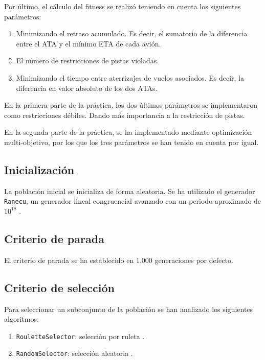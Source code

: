 \documentclass[a4paper,12pt,titlepage]{article}
\begin{document}
Por último, el cálculo del fitness se realizó teniendo en cuenta los siguientes parámetros:

\begin{enumerate}[noitemsep]
	\item Minimizando el retraso acumulado. Es decir, el sumatorio de la diferencia entre el ATA y el mínimo ETA de cada avión.
	\item El número de restricciones de pistas violadas.
	\item Minimizando el tiempo entre aterrizajes de vuelos asociados. Es decir, la diferencia en valor absoluto de los dos ATAs.
\end{enumerate}

En la primera parte de la práctica, los dos últimos parámetros se implementaron como restricciones débiles. Dando más importancia a la restricción de pistas.

En la segunda parte de la práctica, se ha implementado mediante optimización multi-objetivo, por los que los tres parámetros se han tenido en cuenta por igual.

\subsection{Inicialización}

La población inicial se inicializa de forma aleatoria. Se ha utilizado el generador \lstinline|Ranecu|, un generador lineal congruencial avanzado con un periodo aproximado de $10^{18}$ \citep{jclec:ranecu}.

\subsection{Criterio de parada}

El criterio de parada se ha establecido en 1.000 generaciones por defecto.

\subsection{Criterio de selección}

Para seleccionar un subconjunto de la población se han analizado los siguientes algoritmos:

\begin{enumerate}[noitemsep]
	\item \lstinline|RouletteSelector|: selección por ruleta \citep{jclec:roulette}.
	\item \lstinline|RandomSelector|: selección aleatoria \citep{jclec:random}.
\end{enumerate}
\end{document}
